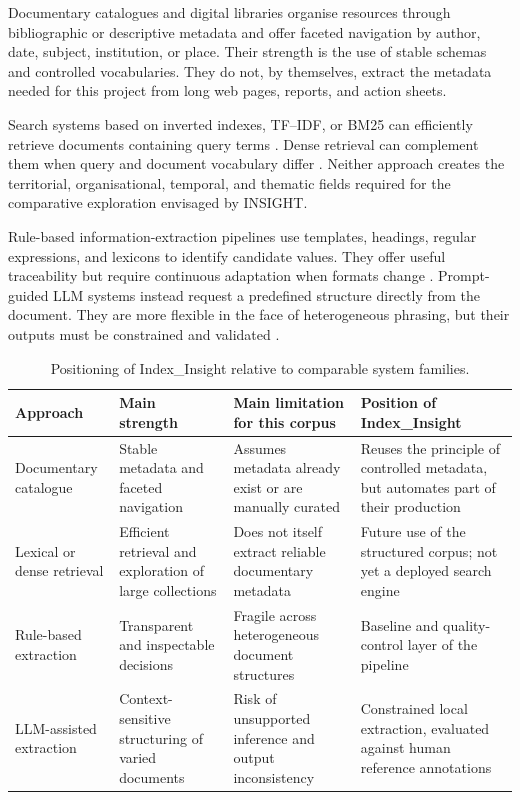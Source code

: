 Documentary catalogues and digital libraries organise resources through
bibliographic or descriptive metadata and offer faceted navigation by author,
date, subject, institution, or place. Their strength is the use of stable
schemas and controlled vocabularies. They do not, by themselves, extract the
metadata needed for this project from long web pages, reports, and action
sheets.

Search systems based on inverted indexes, TF--IDF, or BM25 can efficiently
retrieve documents containing query terms \citep{salton1988term,robertson2009probabilistic}.
Dense retrieval can complement them when query and document vocabulary differ
\citep{karpukhin2020dense}. Neither approach creates the territorial,
organisational, temporal, and thematic fields required for the comparative
exploration envisaged by INSIGHT.

Rule-based information-extraction pipelines use templates, headings, regular
expressions, and lexicons to identify candidate values. They offer useful
traceability but require continuous adaptation when formats change
\citep{sarawagi2008information,grishman2019information}. Prompt-guided LLM
systems instead request a predefined structure directly from the document. They
are more flexible in the face of heterogeneous phrasing, but their outputs must
be constrained and validated \citep{liu2023pre}.

\begin{table}[H]
\centering
\begin{tabular}{p{3.2cm}p{3.5cm}p{3.5cm}p{3.4cm}}
\toprule
Approach & Main strength & Main limitation for this corpus & Position of Index\_Insight \\
\midrule
Documentary catalogue & Stable metadata and faceted navigation & Assumes metadata already exist or are manually curated & Reuses the principle of controlled metadata, but automates part of their production \\

Lexical or dense retrieval & Efficient retrieval and exploration of large collections & Does not itself extract reliable documentary metadata & Future use of the structured corpus; not yet a deployed search engine \\

Rule-based extraction & Transparent and inspectable decisions & Fragile across heterogeneous document structures & Baseline and quality-control layer of the pipeline \\

LLM-assisted extraction & Context-sensitive structuring of varied documents & Risk of unsupported inference and output inconsistency & Constrained local extraction, evaluated against human reference annotations \\
\bottomrule
\end{tabular}
\caption{Positioning of Index\_Insight relative to comparable system families.}
\label{tab:comparable-systems}
\end{table}

